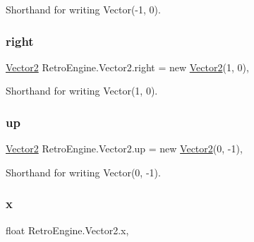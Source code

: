 Shorthand for writing Vector(-\/1, 0). 

\mbox{\label{struct_retro_engine_1_1_vector2_ab51bc58fb69617773c645ea72d4e04a1}} 
\subsubsection{\texorpdfstring{right}{right}}
{\footnotesize\ttfamily \mbox{\hyperlink{struct_retro_engine_1_1_vector2}{Vector2}} Retro\+Engine.\+Vector2.\+right = new \mbox{\hyperlink{struct_retro_engine_1_1_vector2}{Vector2}}(1, 0)\hspace{0.3cm}{\ttfamily [static]}, {\ttfamily [get]}}



Shorthand for writing Vector(1, 0). 

\mbox{\label{struct_retro_engine_1_1_vector2_a3d421fa8ce90b65d8fc62c7634c4ddea}} 
\subsubsection{\texorpdfstring{up}{up}}
{\footnotesize\ttfamily \mbox{\hyperlink{struct_retro_engine_1_1_vector2}{Vector2}} Retro\+Engine.\+Vector2.\+up = new \mbox{\hyperlink{struct_retro_engine_1_1_vector2}{Vector2}}(0, -\/1)\hspace{0.3cm}{\ttfamily [static]}, {\ttfamily [get]}}



Shorthand for writing Vector(0, -\/1). 

\mbox{\label{struct_retro_engine_1_1_vector2_a4f038db4bba5d34aa5f9c5349fe5a993}} 
\subsubsection{\texorpdfstring{x}{x}}
{\footnotesize\ttfamily float Retro\+Engine.\+Vector2.\+x\hspace{0.3cm}{\ttfamily [get]}, {\ttfamily [set]}}

